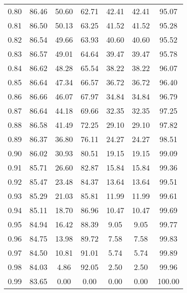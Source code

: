 \begin{tabular}{|c|c|c|c|c|c|c|}
      0.80 &     86.46 &     50.60 &      62.71 &   42.41 &      42.41 &         95.07 \\
      0.81 &     86.50 &     50.13 &      63.25 &   41.52 &      41.52 &         95.28 \\
      0.82 &     86.54 &     49.66 &      63.93 &   40.60 &      40.60 &         95.52 \\
      0.83 &     86.57 &     49.01 &      64.64 &   39.47 &      39.47 &         95.78 \\
      0.84 &     86.62 &     48.28 &      65.54 &   38.22 &      38.22 &         96.07 \\
      0.85 &     86.64 &     47.34 &      66.57 &   36.72 &      36.72 &         96.40 \\
      0.86 &     86.66 &     46.07 &      67.97 &   34.84 &      34.84 &         96.79 \\
      0.87 &     86.64 &     44.18 &      69.66 &   32.35 &      32.35 &         97.25 \\
      0.88 &     86.58 &     41.49 &      72.25 &   29.10 &      29.10 &         97.82 \\
      0.89 &     86.37 &     36.80 &      76.11 &   24.27 &      24.27 &         98.51 \\
      0.90 &     86.02 &     30.93 &      80.51 &   19.15 &      19.15 &         99.09 \\
      0.91 &     85.71 &     26.60 &      82.87 &   15.84 &      15.84 &         99.36 \\
      0.92 &     85.47 &     23.48 &      84.37 &   13.64 &      13.64 &         99.51 \\
      0.93 &     85.29 &     21.03 &      85.81 &   11.99 &      11.99 &         99.61 \\
      0.94 &     85.11 &     18.70 &      86.96 &   10.47 &      10.47 &         99.69 \\
      0.95 &     84.94 &     16.42 &      88.39 &    9.05 &       9.05 &         99.77 \\
      0.96 &     84.75 &     13.98 &      89.72 &    7.58 &       7.58 &         99.83 \\
      0.97 &     84.50 &     10.81 &      91.01 &    5.74 &       5.74 &         99.89 \\
      0.98 &     84.03 &      4.86 &      92.05 &    2.50 &       2.50 &         99.96 \\
      0.99 &     83.65 &      0.00 &       0.00 &    0.00 &       0.00 &        100.00 \\
\bottomrule
\end{tabular}
